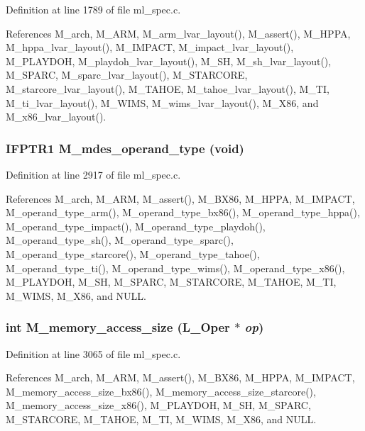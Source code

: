 Definition at line 1789 of file ml\_\-spec.c.

References M\_\-arch, M\_\-ARM, M\_\-arm\_\-lvar\_\-layout(), M\_\-assert(), M\_\-HPPA, M\_\-hppa\_\-lvar\_\-layout(), M\_\-IMPACT, M\_\-impact\_\-lvar\_\-layout(), M\_\-PLAYDOH, M\_\-playdoh\_\-lvar\_\-layout(), M\_\-SH, M\_\-sh\_\-lvar\_\-layout(), M\_\-SPARC, M\_\-sparc\_\-lvar\_\-layout(), M\_\-STARCORE, M\_\-starcore\_\-lvar\_\-layout(), M\_\-TAHOE, M\_\-tahoe\_\-lvar\_\-layout(), M\_\-TI, M\_\-ti\_\-lvar\_\-layout(), M\_\-WIMS, M\_\-wims\_\-lvar\_\-layout(), M\_\-X86, and M\_\-x86\_\-lvar\_\-layout().
\subsubsection{\setlength{\rightskip}{0pt plus 5cm}\bf{IFPTR1} M\_\-mdes\_\-operand\_\-type (void)}\label{ml__spec_8c_13803c3627820c5d987ed2a40e2e705c}




Definition at line 2917 of file ml\_\-spec.c.

References M\_\-arch, M\_\-ARM, M\_\-assert(), M\_\-BX86, M\_\-HPPA, M\_\-IMPACT, M\_\-operand\_\-type\_\-arm(), M\_\-operand\_\-type\_\-bx86(), M\_\-operand\_\-type\_\-hppa(), M\_\-operand\_\-type\_\-impact(), M\_\-operand\_\-type\_\-playdoh(), M\_\-operand\_\-type\_\-sh(), M\_\-operand\_\-type\_\-sparc(), M\_\-operand\_\-type\_\-starcore(), M\_\-operand\_\-type\_\-tahoe(), M\_\-operand\_\-type\_\-ti(), M\_\-operand\_\-type\_\-wims(), M\_\-operand\_\-type\_\-x86(), M\_\-PLAYDOH, M\_\-SH, M\_\-SPARC, M\_\-STARCORE, M\_\-TAHOE, M\_\-TI, M\_\-WIMS, M\_\-X86, and NULL.
\subsubsection{\setlength{\rightskip}{0pt plus 5cm}int M\_\-memory\_\-access\_\-size (L\_\-Oper $\ast$ {\em op})}\label{ml__spec_8c_a39e37a8ef3105eb07055884444ee889}




Definition at line 3065 of file ml\_\-spec.c.

References M\_\-arch, M\_\-ARM, M\_\-assert(), M\_\-BX86, M\_\-HPPA, M\_\-IMPACT, M\_\-memory\_\-access\_\-size\_\-bx86(), M\_\-memory\_\-access\_\-size\_\-starcore(), M\_\-memory\_\-access\_\-size\_\-x86(), M\_\-PLAYDOH, M\_\-SH, M\_\-SPARC, M\_\-STARCORE, M\_\-TAHOE, M\_\-TI, M\_\-WIMS, M\_\-X86, and NULL.
